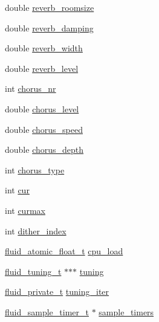 \begin{DoxyCompactItemize}
\item 
double \hyperlink{struct__fluid__synth__t_aff48515df87bba503c23beb49630b201}{reverb\+\_\+roomsize}
\item 
double \hyperlink{struct__fluid__synth__t_a3cde438bb0208371557919f50848bc54}{reverb\+\_\+damping}
\item 
double \hyperlink{struct__fluid__synth__t_ada62a7a0c33984dddd7991a98785e9e7}{reverb\+\_\+width}
\item 
double \hyperlink{struct__fluid__synth__t_a17371e55bd8759856d42c684acdeac66}{reverb\+\_\+level}
\item 
int \hyperlink{struct__fluid__synth__t_aa4ff48d6d5c735e7cf0636cfbbff611b}{chorus\+\_\+nr}
\item 
double \hyperlink{struct__fluid__synth__t_aa9f83aa940e1368fd0001e5344c20416}{chorus\+\_\+level}
\item 
double \hyperlink{struct__fluid__synth__t_a3943708e55d11e04f2997d537c6bfdc1}{chorus\+\_\+speed}
\item 
double \hyperlink{struct__fluid__synth__t_a1c148c907d245a01b9f06c11a75c851f}{chorus\+\_\+depth}
\item 
int \hyperlink{struct__fluid__synth__t_a7bb6a05ba2732edb0fa713bd817fb413}{chorus\+\_\+type}
\item 
int \hyperlink{struct__fluid__synth__t_a848dc868237ebb2a85a4d5dba0c576fa}{cur}
\item 
int \hyperlink{struct__fluid__synth__t_ad16bcbf14e78b0c6eddca53985c469d4}{curmax}
\item 
int \hyperlink{struct__fluid__synth__t_a1630ffb7d83f89f08d9aff883b4e9e83}{dither\+\_\+index}
\item 
\hyperlink{fluidsynth__priv_8h_a046f155f6dcde29c3684e1051f3bc914}{fluid\+\_\+atomic\+\_\+float\+\_\+t} \hyperlink{struct__fluid__synth__t_aa8a4e49c48662e56de3c27d1e44be476}{cpu\+\_\+load}
\item 
\hyperlink{fluidsynth__priv_8h_a06e93e369a12dcdcf9a7c9312622e732}{fluid\+\_\+tuning\+\_\+t} $\ast$$\ast$$\ast$ \hyperlink{struct__fluid__synth__t_a4fec0cbcbfe75e7b7143e47bd3f63918}{tuning}
\item 
\hyperlink{fluid__sys_8h_a3cc330a417a0061f32425bc8e4fc3f24}{fluid\+\_\+private\+\_\+t} \hyperlink{struct__fluid__synth__t_a832765233670acd4364a8b2c2b67b084}{tuning\+\_\+iter}
\item 
\hyperlink{fluidsynth__priv_8h_a4ddade88911e1873bccda1a7750a848c}{fluid\+\_\+sample\+\_\+timer\+\_\+t} $\ast$ \hyperlink{struct__fluid__synth__t_ae7b6a2156ecbeb1aa7c0a08e8ca86188}{sample\+\_\+timers}

\end{DoxyCompactItemize}
